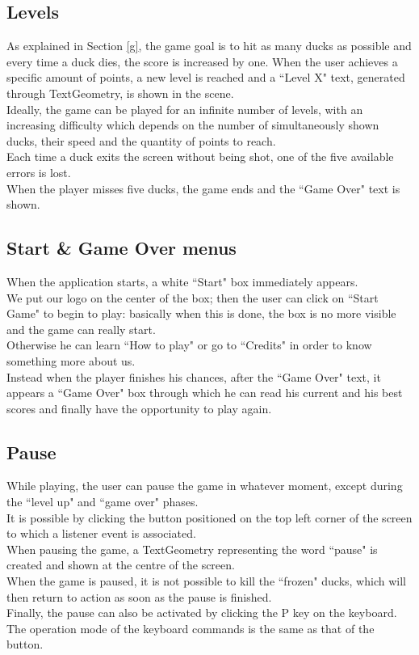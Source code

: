 \documentclass[12pt,a4paper]{article}
\begin{document}
	\subsection{Levels}
	As explained in Section \ref{g}, the game goal is to hit as many ducks as possible and every time a duck dies, the score is increased by one. When the user achieves a specific amount of points, a new level is reached and a ``Level X" text, generated through TextGeometry, is shown in the scene.\\
	Ideally, the game can be played for an infinite number of levels, with an increasing difficulty which depends on the number of simultaneously shown ducks, their speed and the quantity of points to reach.\\
	Each time a duck exits the screen without being shot, one of the five available errors is lost.\\ When the player misses five ducks, the game ends and the ``Game Over" text is shown.
	
	\subsection{Start \& Game Over menus}
	When the application starts, a white ``Start" box immediately appears.\\
	We put our logo on the center of the box; then the user can click on ``Start Game" to begin to play: basically when this is done, the box is no more visible and the game can really start. \\
	Otherwise he can learn ``How to play" or go to ``Credits" in order to know something more about us.\\
	Instead when the player finishes his chances, after the ``Game Over" text, it appears a ``Game Over" box through which he can read his current and his best scores and finally have the opportunity to play again.
	
	\subsection{Pause}
	While playing, the user can pause the game in whatever moment, except during the ``level up" and ``game over" phases.\\
	It is possible by clicking the button positioned on the top left corner of the screen to which a listener event is associated.\\
	When pausing the game, a TextGeometry representing the word ``pause" is created and shown at the centre of the screen.\\
	When the game is paused, it is not possible to kill the ``frozen" ducks, which will then return to action as soon as the pause is finished.\\
	Finally, the pause can also be activated by clicking the P key on the keyboard. The operation mode of the keyboard commands is the same as that of the button.
\end{document}
